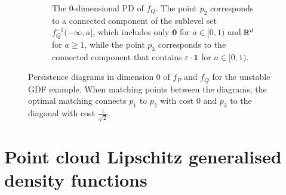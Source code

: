 \begin{figure}
\begin{subfigure}[t]{0.5\textwidth}
        \caption{The $0$-dimensional PD of $f_Q$. The point $p_2$ corresponds to
        a connected component of the sublevel set $f_Q^{-1}(-\infty, a]$, which
        includes only $\mathbf{0}$ for $a \in [0, 1)$ and $\mathbb{R}^d$ for $a \geq
        1$, while the point $p_3$ corresponds to the connected component that
        contains $\varepsilon \cdot \mathbf{1}$ for $a \in [0, 1)$.}
    \end{subfigure}%
    \caption{Persistence diagrams in dimension $0$ of $f_P$ and $f_Q$ for the
    unstable GDF example. When matching points between the diagrams, the optimal
    matching connects $p_1$ to $p_2$ with cost $0$ and $p_3$ to the diagonal
    with cost $\frac{1}{\sqrt{2}}$.}
    \label{fig:pd_unstable}
\end{figure}

\section{Point cloud Lipschitz generalised density functions}

